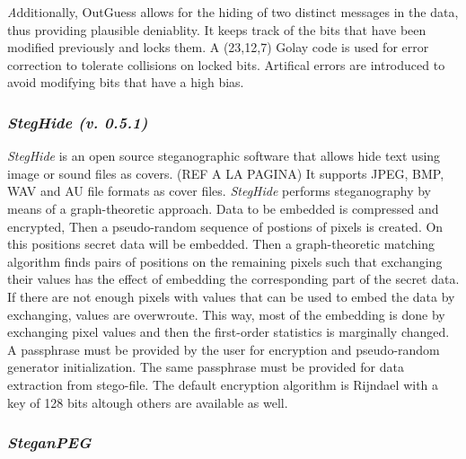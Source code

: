 \documentclass[11pt]{article}
\begin{document}
\textit Additionally,  {OutGuess}  allows  for the hiding of two distinct messages in the data, thus providing plausible 
deniablity.  It keeps track  of  the  bits  that  have  been  modified previously  and  locks  them.   A  (23,12,7)  Golay  code  
is used for error correction to tolerate collisions on locked bits.  Artifical errors are introduced  to  avoid  modifying bits 
that have a high bias.

\subsubsection{\textit{}}

\subsubsection{\textit{StegHide (v. 0.5.1)}}
\textit{StegHide} is an open source steganographic software that allows hide text using image or sound files as covers. (REF A LA PAGINA)
It supports JPEG, BMP, WAV and AU file formats as cover files. 
\textit{StegHide} performs steganography by means of a graph-theoretic approach. Data to be embedded is compressed and encrypted,
Then a pseudo-random sequence of postions of pixels is created. On this positions secret data will be embedded. Then a
graph-theoretic  matching  algorithm finds pairs of positions on the remaining pixels such that exchanging their values has
the effect of embedding the corresponding  part of the secret data. If there are not enough pixels with values that can be used
to embed the data by exchanging, values are overwroute. This way, most of the embedding  is  done  by  exchanging  pixel  values
and then the first-order statistics is marginally changed. A passphrase must be provided by the user for encryption and
pseudo-random generator initialization. The same passphrase must be provided for data extraction from stego-file. The default
encryption algorithm is Rijndael with a key of 128 bits altough others are available as well.



\subsubsection{\textit{}}

\subsubsection{\textit{SteganPEG}}

\end{document}
